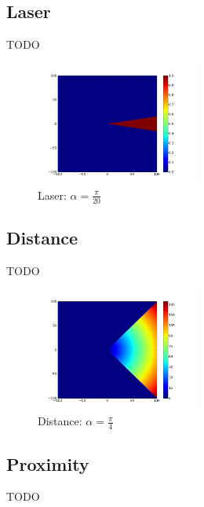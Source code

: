 \documentclass[a4paper]{article}
\begin{document}
\subsection{Laser}
TODO

\begin{figure}
	\vspace{-30pt}
	\begin{center}
		\includegraphics[width=0.48\textwidth]{graphs/sensors/laser.png}
	\end{center}
	\vspace{-30pt}
	\caption{Laser: $\alpha=\frac{\pi}{20}$}
\end{figure}


\subsection{Distance}
TODO

\begin{figure}
	\vspace{-30pt}
	\begin{center}
		\includegraphics[width=0.48\textwidth]{graphs/sensors/distance.png}
	\end{center}
	\vspace{-30pt}
	\caption{Distance: $\alpha=\frac{\pi}{4}$}
\end{figure}

\subsection{Proximity}
TODO
\end{document}
